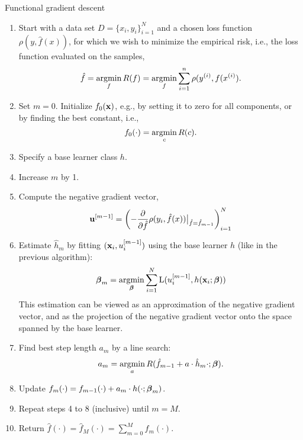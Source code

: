 \begin{algorithm}
\caption{Functional gradient descent}
\label{algo:fgd}
\begin{enumerate}
    \item Start with a data set $D=\{x_i, y_i\}_{i=1}^N$ and a chosen loss function $\rho(y,\hat{f}(x))$, for which we wish to
        minimize the empirical risk, i.e., the loss function evaluated on the samples,
        \begin{equation}
            \hat{f}=\operatorname*{argmin}_{f}R(f)=\operatorname*{argmin}_{f}\sum_{i=1}^n\rho(y^{(i)},f(x^{(i)}).
        \end{equation}
    \item Set $m=0$. Initialize $f_0(\mathbf{x})$, e.g., by setting it to zero for all components, or by finding the best constant, i.e.,
        \begin{equation}
            f_0(\cdot)=\operatorname*{argmin}_c R(c).
        \end{equation}
    \item Specify a base learner class $h$.
    \item Increase $m$ by 1.
    \item Compute the negative gradient vector,
        \begin{equation}
            \mathbf{u}^{[m-1]}=\left(-\frac{\partial}{\partial \hat{f}}\rho(y_i, \hat{f}(x))\big\rvert_{\hat{f}=\hat{f}_{m-1}}\right)_{i=1}^N
        \end{equation}
    \item Estimate $\hat{h}_m$ by fitting $(\mathbf{x}_i,u_i^{[m-1]})$ using the base learner $h$ (like in the previous algorithm):
        \begin{equation*}
            \boldsymbol{\beta}_m=\operatorname*{argmin}_{\boldsymbol{\beta}}\sum_{i=1}^N\operatorname{L}(u_i^{[m-1]},h(\mathbf{x}_i;\boldsymbol{\beta}))
        \end{equation*}
        This estimation can be viewed as an approximation of the negative gradient vector, and as the projection of the negative gradient vector onto the space spanned by the base learner.
    \item Find best step length $a_m$ by a line search:
        \begin{equation*}
            a_m=\operatorname*{argmin}_{a}R(\hat{f}_{m-1}+a\cdot\hat{h}_m{\cdot;\boldsymbol{\beta}}).
        \end{equation*}
    \item Update $f_m(\cdot)=f_{m-1}(\cdot)+a_m\cdot h(\cdot;\boldsymbol{\beta}_m)$.
    \item Repeat steps 4 to 8 (inclusive) until $m=M$.
    \item Return $\hat{f}(\cdot)=\hat{f}_M(\cdot)=\sum_{m=0}^Mf_m(\cdot)$.
\end{enumerate}
\end{algorithm}
